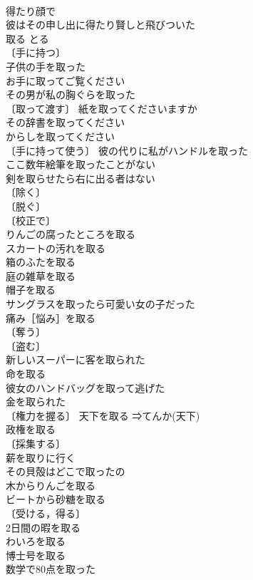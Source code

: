 \documentclass[8pt]{extreport}
\begin{document}
\begin{CJK}{UTF8}{min}
\\	得たり顔で 
\\	彼はその申し出に得たり賢しと飛びついた 
\\	取る	とる	
\\	〔手に持つ〕
\\	子供の手を取った 
\\	お手に取ってご覧ください 
\\	その男が私の胸ぐらを取った 
\\	〔取って渡す〕 紙を取ってくださいますか 
\\	その辞書を取ってください 
\\	からしを取ってください 
\\	〔手に持って使う〕 彼の代りに私がハンドルを取った 
\\	ここ数年絵筆を取ったことがない 
\\	剣を取らせたら右に出る者はない 
\\	〔除く〕
\\	〔脱ぐ〕
\\	〔校正で〕
\\	りんごの腐ったところを取る 
\\	スカートの汚れを取る 
\\	箱のふたを取る 
\\	庭の雑草を取る 
\\	帽子を取る 
\\	サングラスを取ったら可愛い女の子だった 
\\	痛み［悩み］を取る 
\\	〔奪う〕
\\	〔盗む〕
\\	新しいスーパーに客を取られた 
\\	命を取る 
\\	彼女のハンドバッグを取って逃げた 
\\	金を取られた 
\\	〔権力を握る〕 天下を取る ⇒てんか(天下)　
\\	政権を取る 
\\	〔採集する〕
\\	薪を取りに行く 
\\	その貝殻はどこで取ったの 
\\	木からりんごを取る 
\\	ビートから砂糖を取る 
\\	〔受ける，得る〕
\\	2日間の暇を取る 
\\	わいろを取る 
\\	博士号を取る 
\\	数学で80点を取った 

\end{CJK}
\end{document}
